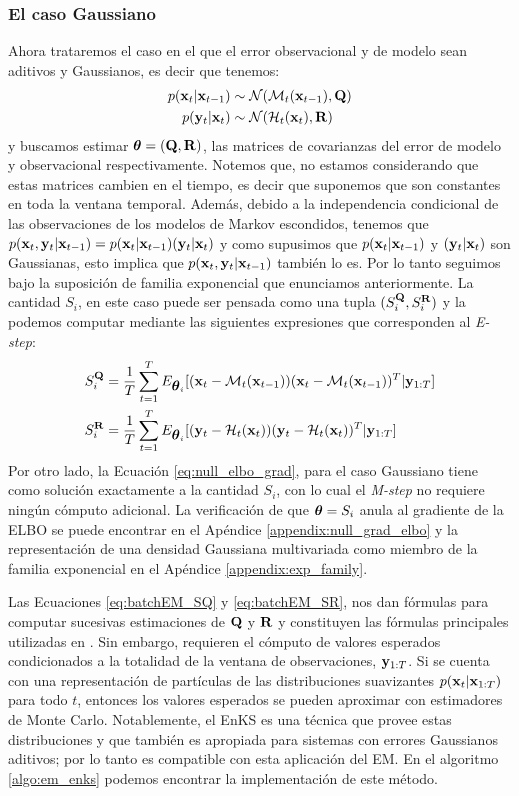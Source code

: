 \subsubsection*{El caso Gaussiano}
Ahora trataremos el caso en el que el error observacional y de modelo sean aditivos y Gaussianos, es decir que tenemos:
\begin{align}
    p(\mathbf{x}_t | \mathbf{x}_{t-1}) &\sim \mathcal{N}(\mathcal{M}_t(\mathbf{x}_{t-1}), \mathbf{Q}) \\
    p(\mathbf{y}_t | \mathbf{x}_t) &\sim \mathcal{N}(\mathcal{H}_t(\mathbf{x}_t), \mathbf{R})
\end{align}
y buscamos estimar $\mbox{\boldmath$ \theta $} = (\mathbf{Q}, \mathbf{R})$, las matrices de covarianzas del error de modelo y observacional respectivamente. Notemos que, no estamos considerando que estas matrices cambien en el tiempo, es decir que suponemos que son constantes en toda la ventana temporal. Además, debido a la independencia condicional de las observaciones de los modelos de Markov escondidos, tenemos que $p(\mathbf{x}_t, \mathbf{y}_t | \mathbf{x}_{t-1}) = p(\mathbf{x}_t | \mathbf{x}_{t-1}) (\mathbf{y}_t | \mathbf{x}_t)$ y como supusimos que $p(\mathbf{x}_t | \mathbf{x}_{t-1})$ y $(\mathbf{y}_t | \mathbf{x}_t)$ son Gaussianas, esto implica que $p(\mathbf{x}_t, \mathbf{y}_t | \mathbf{x}_{t-1})$ también lo es. Por lo tanto seguimos bajo la suposición de familia exponencial que enunciamos anteriormente. La cantidad $S_i$, en este caso puede ser pensada como una tupla $(S_i^{\mathbf{Q}}, S_i^{\mathbf{R}})$ y la podemos computar mediante las siguientes expresiones que corresponden al \textit{E-step}:
\begin{align}
    S_i^{\mathbf{Q}} &= \frac{1}{T}\sum_{t=1}^T E_{\mbox{\boldmath$ \theta $}_i}[(\mathbf{x}_t - \mathcal{M}_t(\mathbf{x}_{t-1}))(\mathbf{x}_t - \mathcal{M}_t(\mathbf{x}_{t-1}))^T | \mathbf{y}_{1:T}] \label{eq:batchEM_SQ} \\
    S_i^{\mathbf{R}} &= \frac{1}{T}\sum_{t=1}^T E_{\mbox{\boldmath$ \theta $}_i}[(\mathbf{y}_t - \mathcal{H}_t(\mathbf{x}_t))(\mathbf{y}_t - \mathcal{H}_t(\mathbf{x}_t))^T | \mathbf{y}_{1:T}] \label{eq:batchEM_SR}
\end{align}
Por otro lado, la Ecuación \ref{eq:null_elbo_grad}, para el caso Gaussiano tiene como solución exactamente a la cantidad $S_i$, con lo cual el \textit{M-step} no requiere ningún cómputo adicional. La verificación de que $\mbox{\boldmath$ \theta $} = S_i$ anula al gradiente de la ELBO se puede encontrar en el Apéndice \ref{appendix:null_grad_elbo} y la representación de una densidad Gaussiana multivariada como miembro de la familia exponencial en el Apéndice \ref{appendix:exp_family}.

Las Ecuaciones \ref{eq:batchEM_SQ} y \ref{eq:batchEM_SR}, nos dan fórmulas para computar sucesivas estimaciones de $\mathbf{Q}$ y $\mathbf{R}$ y constituyen las fórmulas principales utilizadas en \cite{Tandeo2015, Dreano2017, Pulido2018}. Sin embargo, requieren el cómputo de valores esperados condicionados a la totalidad de la ventana de observaciones, $\mathbf{y}_{1:T}$. Si se cuenta con una representación de partículas de las distribuciones suavizantes $p(\mathbf{x}_t | \mathbf{x}_{1:T})$ para todo $t$, entonces los valores esperados se pueden aproximar con estimadores de Monte Carlo. Notablemente, el EnKS es una técnica que provee estas distribuciones y que también es apropiada para sistemas con errores Gaussianos aditivos; por lo tanto es compatible con esta aplicación del EM. En el algoritmo \ref{algo:em_enks} podemos encontrar la implementación de este método.

